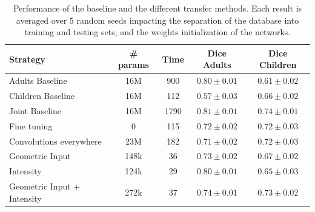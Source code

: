 \begin{table}
	\centering
\begin{tabular}{|l|c|c|c|c|}
	\hline
    Strategy & \# params & Time & Dice Adults & Dice Children \\
	\hline
    Adults Baseline & 16M & 900 & $\bm{0.80 \pm 0.01}$ & $0.61 \pm 0.02$ \\
    Children Baseline & 16M & 112 & $0.57 \pm 0.03$ & $\bm{0.66 \pm 0.02}$ \\
    Joint Baseline & 16M & 1790 & $\bm{0.81 \pm 0.01}$ & $\bm{0.74 \pm 0.01}$ \\
    \hline
    Fine tuning & 0 & 115 & $0.72 \pm 0.02$ & $0.72 \pm 0.03$ \\
    Convolutions everywhere & 23M & 182 & $0.71 \pm 0.02$ & $0.72 \pm 0.03$ \\
    Geometric Input & 148k & 36 & $0.73 \pm 0.02$ & $0.67 \pm 0.02$ \\
    Intensity & 124k & 29 & $0.80 \pm 0.01$ & $0.65 \pm 0.03$ \\
    Geometric Input + Intensity & 272k & 37 & $\bm{0.74 \pm 0.01}$ & $\bm{0.73 \pm 0.02}$ \\
    \hline
\end{tabular}
	\vspace{2mm}
	\caption{Performance of the baseline and the different transfer methods. Each result is averaged over 5 random seeds impacting the separation of the database into training and testing sets, and the weights initialization of the networks.}
    \label{table:results}
\end{table}

